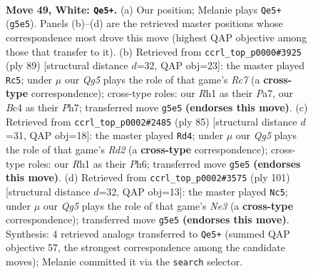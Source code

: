 \documentclass[11pt]{article}
\begin{document}
\clearpage

\begin{figure}[p]\centering
\begin{subfigure}{0.46\textwidth}\centering
\resizebox{\linewidth}{!}{%
\newchessgame
\chessboard[
  setfen={4kr2/1b6/8/6Q1/2B5/7P/1p4P1/6KR w - - 7 49},
  showmover=false,
  pgfstyle=straightmove, color=movearrow, markmove={g5-e5}
]}
\caption{}
\end{subfigure}\hfill
\begin{subfigure}{0.46\textwidth}\centering
\resizebox{\linewidth}{!}{%
\newchessgame
\chessboard[
  setfen={6k1/p4p1p/6p1/3B4/8/1P6/2r5/4RK2 b - - 2 45},
  showmover=false,
  pgfstyle=straightmove, color=movearrow, markmove={c2-c5}
]}
\caption{}
\end{subfigure}
\\[4pt]
\begin{subfigure}{0.46\textwidth}\centering
\resizebox{\linewidth}{!}{%
\newchessgame
\chessboard[
  setfen={6k1/3r1p2/7p/4R1b1/1PB5/5K1P/8/8 b - - 2 43},
  showmover=false,
  pgfstyle=straightmove, color=movearrow, markmove={d7-d4}
]}
\caption{}
\end{subfigure}\hfill
\begin{subfigure}{0.46\textwidth}\centering
\resizebox{\linewidth}{!}{%
\newchessgame
\chessboard[
  setfen={8/4krp1/1p2n3/4B2P/6K1/8/8/3R4 b - - 5 51},
  showmover=false,
  pgfstyle=straightmove, color=movearrow, markmove={e6-c5}
]}
\caption{}
\end{subfigure}
\caption{\textbf{Move 49, White: \texttt{Qe5+}.} (a) Our position; Melanie plays \texttt{Qe5+} (\texttt{g5e5}). Panels (b)--(d) are the retrieved master positions whose correspondence most drove this move (highest QAP objective among those that transfer to it). (b) Retrieved from \texttt{ccrl\_top\_p0000\#3925} (ply 89) [structural distance $d$=32, QAP obj=23]: the master played \texttt{Rc5}; under $\mu$ our \emph{Qg5} plays the role of that game's \emph{Rc7} (a \textbf{cross-type} correspondence); cross-type roles: our \emph{R}h1 as their \emph{P}a7, our \emph{B}c4 as their \emph{P}h7; transferred move \texttt{g5e5} \textbf{(endorses this move)}. (c) Retrieved from \texttt{ccrl\_top\_p0002\#2485} (ply 85) [structural distance $d$=31, QAP obj=18]: the master played \texttt{Rd4}; under $\mu$ our \emph{Qg5} plays the role of that game's \emph{Rd2} (a \textbf{cross-type} correspondence); cross-type roles: our \emph{R}h1 as their \emph{P}h6; transferred move \texttt{g5e5} \textbf{(endorses this move)}. (d) Retrieved from \texttt{ccrl\_top\_p0002\#3575} (ply 101) [structural distance $d$=32, QAP obj=13]: the master played \texttt{Nc5}; under $\mu$ our \emph{Qg5} plays the role of that game's \emph{Ne3} (a \textbf{cross-type} correspondence); transferred move \texttt{g5e5} \textbf{(endorses this move)}. Synthesis: 4 retrieved analogs transferred to \texttt{Qe5+} (summed QAP objective 57, the strongest correspondence among the candidate moves); Melanie committed it via the \texttt{search} selector.}
\label{fig:thought-m96}
\end{figure}
\end{document}
